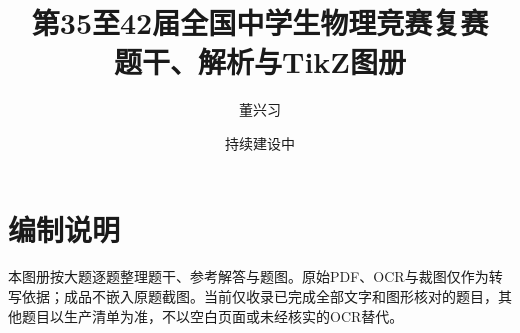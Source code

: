 \documentclass[12pt,a4paper]{ctexart}
\title{第35至42届全国中学生物理竞赛复赛\\题干、解析与TikZ图册}
\author{董兴习}
\date{持续建设中}
\begin{document}
\pagestyle{plain}
\maketitle
\tableofcontents

\section*{编制说明}
本图册按大题逐题整理题干、参考解答与题图。原始PDF、OCR与裁图仅作为转写依据；成品不嵌入原题截图。当前仅收录已完成全部文字和图形核对的题目，其他题目以生产清单为准，不以空白页面或未经核实的OCR替代。





























































\end{document}
